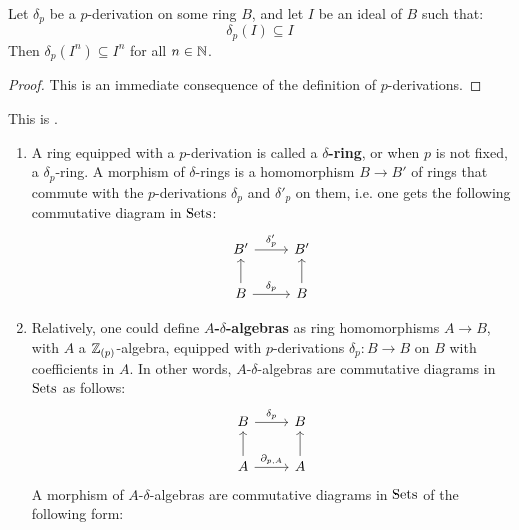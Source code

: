             \begin{proposition}
                Let $\delta_p$ be a $p$-derivation on some ring $B$, and let $I$ be an ideal of $B$ such that:
                    $$\delta_p(I) \subseteq I$$
                Then $\delta_p(I^n) \subseteq I^n$ for all $n \in \mathbb{N}$. 
            \end{proposition}
                \begin{proof}
                    This is an immediate consequence of the definition of $p$-derivations.
                \end{proof}
                
            \begin{definition} \label{def: delta_rings}
                This is \cite[Definition 2.1]{bhatt_scholze_prisms}.
                \begin{enumerate}
                    \item A ring equipped with a $p$-derivation is called a \textbf{$\delta$-ring}, or when $p$ is not fixed, a $\delta_p$-ring. A morphism of $\delta$-rings is a homomorphism $B \to B'$ of rings that commute with the $p$-derivations $\delta_p$ and $\delta'_p$ on them, i.e. one gets the following commutative diagram in $\mathrm{Sets}$:
                        $$
                            \begin{tikzcd}
                                B' \arrow[r, "\delta_p'"]         & B'          \\
                                B \arrow[u] \arrow[r, "\delta_p"] & B \arrow[u]
                            \end{tikzcd}
                        $$
                    \item Relatively, one could define \textbf{$A$-$\delta$-algebras} as ring homomorphisms $A \to B$, with $A$ a $\mathbb{Z}_{(p)}$-algebra, equipped with $p$-derivations $\delta_p: B \to B$ on $B$ with coefficients in $A$. In other words, $A$-$\delta$-algebras are commutative diagrams in $\mathrm{Sets}$ as follows:
                        $$
                            \begin{tikzcd}
                                B \arrow[r, "\delta_p"]               & B           \\
                                A \arrow[u] \arrow[r, "{\del_{p,A}}"] & A \arrow[u]
                            \end{tikzcd}
                        $$
                    A morphism of $A$-$\delta$-algebras are commutative diagrams in $\mathrm{Sets}$ of the following form:

\end{enumerate}
\end{definition}

